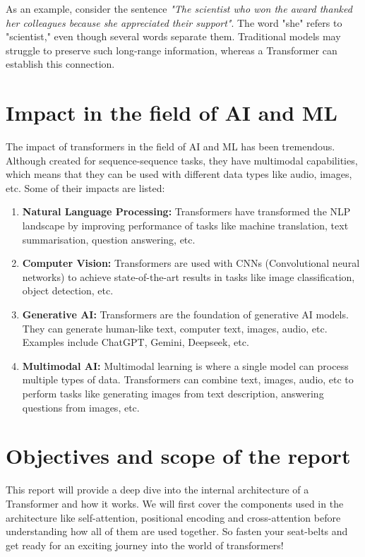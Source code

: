 As an example, consider the sentence \textit{"The scientist who won the award thanked her colleagues because she appreciated their support"}. The word "she" refers to "scientist," even though several words separate them. Traditional models may struggle to preserve such long-range information, whereas a Transformer can establish this connection.

\section{Impact in the field of AI and ML}

The impact of transformers in the field of AI and ML has been tremendous. Although created for sequence-sequence tasks, they have multimodal capabilities, which means that they can be used with different data types like audio, images, etc. Some of their impacts are listed:

\begin{enumerate}
    \item \textbf{Natural Language Processing:} Transformers have transformed the NLP landscape by improving performance of tasks like machine translation, text summarisation, question answering, etc.
    \item \textbf{Computer Vision:} Transformers are used with CNNs (Convolutional neural networks) to achieve state-of-the-art results in tasks like image classification, object detection, etc.
    \item \textbf{Generative AI:} Transformers are the foundation of generative AI models. They can generate human-like text, computer text, images, audio, etc. Examples include ChatGPT, Gemini, Deepseek, etc.
    \item \textbf{Multimodal AI:} Multimodal learning is where a single model can process multiple types of data. Transformers can combine text, images, audio, etc to perform tasks like generating images from text description, answering questions from images, etc.
\end{enumerate}

\section{Objectives and scope of the report}

This report will provide a deep dive into the internal architecture of a Transformer and how it works. We will first cover the components used in the architecture like self-attention, positional encoding and cross-attention before understanding how all of them are used together. So fasten your seat-belts and get ready for an exciting journey into the world of transformers!
